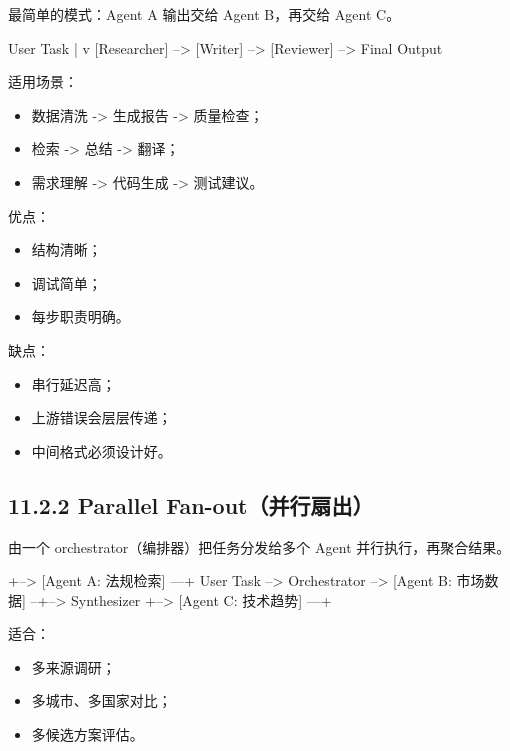 最简单的模式：Agent A 输出交给 Agent B，再交给 Agent C。


\begin{codeblock}
User Task
   |
   v
[Researcher] --> [Writer] --> [Reviewer] --> Final Output
\end{codeblock}

适用场景：


\begin{itemize}[leftmargin=2em]
\item 数据清洗 -> 生成报告 -> 质量检查；
\item 检索 -> 总结 -> 翻译；
\item 需求理解 -> 代码生成 -> 测试建议。
\end{itemize}

优点：


\begin{itemize}[leftmargin=2em]
\item 结构清晰；
\item 调试简单；
\item 每步职责明确。
\end{itemize}

缺点：


\begin{itemize}[leftmargin=2em]
\item 串行延迟高；
\item 上游错误会层层传递；
\item 中间格式必须设计好。
\end{itemize}

\subsection{11.2.2 Parallel Fan-out（并行扇出）}

由一个 orchestrator（编排器）把任务分发给多个 Agent 并行执行，再聚合结果。


\begin{codeblock}
                 +--> [Agent A: 法规检索] ---+
User Task --> Orchestrator --> [Agent B: 市场数据] --+--> Synthesizer
                 +--> [Agent C: 技术趋势] ---+
\end{codeblock}

适合：


\begin{itemize}[leftmargin=2em]
\item 多来源调研；
\item 多城市、多国家对比；
\item 多候选方案评估。
\end{itemize}

